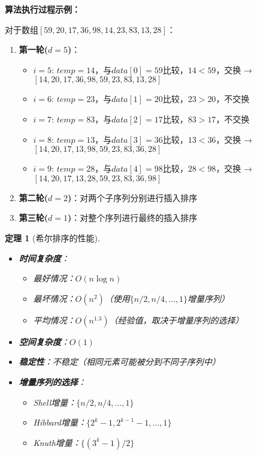 \documentclass[12pt,a4paper]{amsart}
\newtheorem{theorem}{定理}[section]
\begin{document}
\textbf{算法执行过程示例：}

对于数组$[59, 20, 17, 36, 98, 14, 23, 83, 13, 28]$：

\begin{enumerate}
\item \textbf{第一轮($d=5$)}：
    \begin{itemize}
    \item $i=5$: $temp=14$，与$data[0]=59$比较，$14<59$，交换 → $[14, 20, 17, 36, 98, 59, 23, 83, 13, 28]$
    \item $i=6$: $temp=23$，与$data[1]=20$比较，$23>20$，不交换
    \item $i=7$: $temp=83$，与$data[2]=17$比较，$83>17$，不交换
    \item $i=8$: $temp=13$，与$data[3]=36$比较，$13<36$，交换 → $[14, 20, 17, 13, 98, 59, 23, 83, 36, 28]$
    \item $i=9$: $temp=28$，与$data[4]=98$比较，$28<98$，交换 → $[14, 20, 17, 13, 28, 59, 23, 83, 36, 98]$
    \end{itemize}

\item \textbf{第二轮($d=2$)}：对两个子序列分别进行插入排序

\item \textbf{第三轮($d=1$)}：对整个序列进行最终的插入排序
\end{enumerate}

\begin{theorem}[希尔排序的性能]
\indent
\begin{itemize}
\item \textbf{时间复杂度}：
    \begin{itemize}
    \item 最好情况：$O(n\log n)$
    \item 最坏情况：$O(n^2)$（使用$\{n/2, n/4, \ldots, 1\}$增量序列）
    \item 平均情况：$O(n^{1.3})$（经验值，取决于增量序列的选择）
    \end{itemize}
\item \textbf{空间复杂度}：$O(1)$
\item \textbf{稳定性}：不稳定（相同元素可能被分到不同子序列中）
\item \textbf{增量序列的选择}：
    \begin{itemize}
    \item Shell增量：$\{n/2, n/4, \ldots, 1\}$
    \item Hibbard增量：$\{2^k-1, 2^{k-1}-1, \ldots, 1\}$
    \item Knuth增量：$\{(3^k-1)/2\}$
    \end{itemize}
\end{itemize}
\end{theorem}
\end{document}
